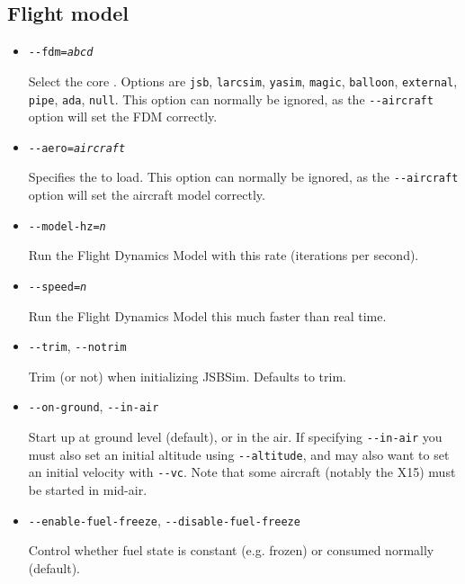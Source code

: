 {
  \subsection{Flight model}\label{flight dynamics model}
  \begin{itemize}
  \item{\texttt{-$ $-fdm={\it abcd}}}

  Select the core . Options are \texttt{jsb}, \texttt{larcsim}, \texttt{yasim},
  \texttt{magic}, \texttt{balloon}, \texttt{external}, \texttt{pipe}, \texttt{ada}, \texttt{null}.
  This option can normally be ignored, as the \texttt{-$ $-aircraft} option will set the FDM correctly.

  \item{\texttt{-$ $-aero={\it aircraft}}}

  Specifies the  to load. This option can normally be ignored, as
  the \texttt{-$ $-aircraft} option will set the aircraft model correctly.

  \item{\texttt{-$ $-model-hz={\it n}}}

  Run the Flight Dynamics Model with this rate (iterations per second).

  \item{\texttt{-$ $-speed={\it n}}}

  Run the Flight Dynamics Model this much faster than real time.

  \item{\texttt{-$ $-trim}, \texttt{-$ $-notrim}}

  Trim (or not) when initializing JSBSim. Defaults to trim.

  \item{\texttt{-$ $-on-ground}, \texttt{-$ $-in-air}}

  Start up at ground level (default), or in the air. If specifying \texttt{-$ $-in-air} you
  must also set an initial altitude using \texttt{-$ $-altitude}, and may also want to set
  an initial velocity with \texttt{-$ $-vc}. Note that some aircraft (notably the X15) must
  be started in mid-air.

  \item{\texttt{-$ $-enable-fuel-freeze}, \texttt{-$ $-disable-fuel-freeze}}

  Control whether fuel state is constant (e.g. frozen) or consumed normally (default).

  \end{itemize}
}

